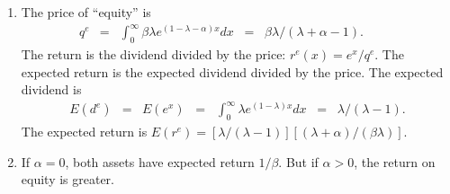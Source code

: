 \documentclass[11pt]{article}
\begin{document}
\begin{enumerate}
\begin{enumerate}
\item The price of ``equity'' is
\begin{eqnarray*}
    q^e &=& \int_{0}^\infty \beta \lambda e^{(1-\lambda -\alpha) x} dx
            \;\;=\;\; \beta \lambda /(\lambda + \alpha-1) . \phantom{sum^K}
\end{eqnarray*}
The return is the dividend divided by the price:  $r^e(x) = e^x/q^e$.
The expected return is the expected dividend divided by the price.
The expected dividend is
\begin{eqnarray*}
    E(d^e) &=& E(e^x) \;\;=\;\; \int_{0}^\infty \lambda e^{(1-\lambda) x} dx
            \;\;=\;\; \lambda/(\lambda-1) .
\end{eqnarray*}
The expected return is $ E(r^e) = [\lambda/(\lambda-1)] [(\lambda+\alpha)/(\beta \lambda) ]$.

\item If $\alpha = 0$, both assets have expected return $1/\beta$.
But if $\alpha > 0$, the return on equity is greater.

\end{enumerate}
\end{enumerate}



\end{document}
